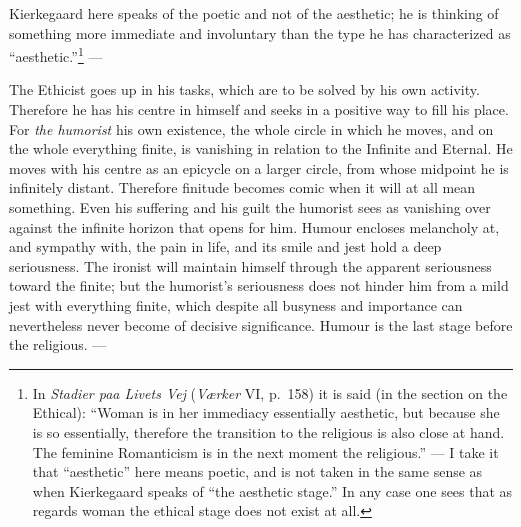 \documentclass[12pt,a4paper]{book}
\newcommand{\opage}[1]{\marginnote{\footnotesize\textit{[#1]}}}
\begin{document}
Kierkegaard here speaks of the poetic and not of the aesthetic; he is thinking of something
\opage{160}more immediate and involuntary than the type he has characterized as ``aesthetic.''\footnote{In
\emph{Stadier paa Livets Vej} (\emph{Værker} VI, p.~158) it is said (in the section on the
Ethical): ``Woman is in her immediacy essentially aesthetic, but because she is so essentially,
therefore the transition to the religious is also close at hand. The feminine Romanticism is in
the next moment the religious.'' --- I take it that ``aesthetic'' here means poetic, and is not
taken in the same sense as when Kierkegaard speaks of ``the aesthetic stage.'' In any case one
sees that as regards woman the ethical stage does not exist at all.} ---

The Ethicist goes up in his tasks, which are to be solved by his own activity. Therefore he has
his centre in himself and seeks in a positive way to fill his place. For \emph{the humorist} his
own existence, the whole circle in which he moves, and on the whole everything finite, is
vanishing in relation to the Infinite and Eternal. He moves with his centre as an epicycle on a
larger circle, from whose midpoint he is infinitely distant. Therefore finitude becomes comic
when it will at all mean something. Even his suffering and his guilt the humorist sees as
vanishing over against the infinite horizon that opens for him. Humour encloses melancholy at,
and sympathy with, the pain in life, and its smile and jest hold a deep seriousness. The ironist
will maintain himself through the apparent seriousness toward the finite; but the humorist's
seriousness does not hinder him from a mild jest with everything finite, which despite all
busyness and importance can nevertheless never become of decisive significance. Humour is the
last stage before the religious. ---
\end{document}
